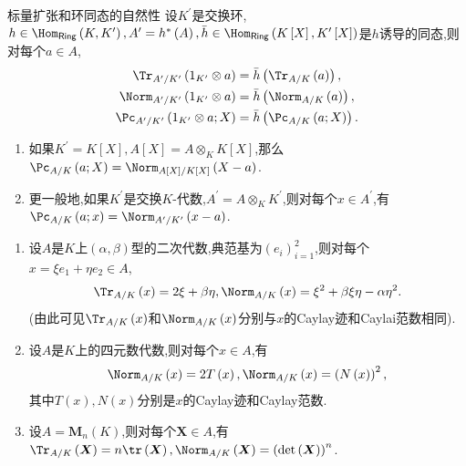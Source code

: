 \begin{proposition}{标量扩张和环同态的自然性}{}
	设$K^{\prime}$是交换环,$h\in\Hom_{\mathsf{Ring}}\left(K,K^{\prime}\right),A^{\prime}=h^{\ast}\left(A\right),\bar{h}\in\Hom_{\mathsf{Ring}}\left(K\left[X\right],K^{\prime}\left[X\right]\right)$是$h$诱导的同态,则对每个$a\in A$,
	\begin{gather*}
		\Tr_{A^{\prime}/K^{\prime}}\left(1_{K^{\prime}}\otimes a\right)=\bar{h}\left(\Tr_{A/K}\left(a\right)\right),\\
		\Norm_{A^{\prime}/K^{\prime}}\left(1_{K^{\prime}}\otimes a\right)=\bar{h}\left(\Norm_{A/K}\left(a\right)\right),\\
		\Pc_{A^{\prime}/K^{\prime}}\left(1_{K^{\prime}}\otimes a;X\right)=\bar{h}\left(\Pc_{A/K}\left(a;X\right)\right).
	\end{gather*}
\end{proposition}

\begin{remark}{}{}
	\begin{enumerate}
		\item 如果$K^{\prime}=K\left[X\right],A\left[X\right]=A\otimes_{K}K\left[X\right]$,那么$\Pc_{A/K}\left(a;X\right)=\Norm_{A\left[X\right]/K\left[X\right]}\left(X-a\right)$.
		\item 更一般地,如果$K^{\prime}$是交换$K$-代数,$A^{\prime}=A\otimes_{K}K^{\prime}$,则对每个$x\in A^{\prime}$,有$\Pc_{A/K}\left(a;x\right)=\Norm_{A^{\prime}/K^{\prime}}\left(x-a\right)$.
	\end{enumerate}
\end{remark}

\begin{example}{}{}
	\begin{enumerate}
		\item 设$A$是$K$上$\left(\alpha,\beta\right)$型的二次代数,典范基为$\left(e_{i}\right)_{i=1}^{2}$,则对每个$x=\xi e_{1}+\eta e_{2}\in A$,
		\begin{align*}
			\Tr_{A/K}\left(x\right)=2\xi+\beta\eta,\Norm_{A/K}\left(x\right)=\xi^{2}+\beta\xi\eta-\alpha\eta^{2}.
		\end{align*}
		(由此可见$\Tr_{A/K}\left(x\right)$和$\Norm_{A/K}\left(x\right)$分别与$x$的Caylay迹和Caylai范数相同).
		\item 设$A$是$K$上的四元数代数,则对每个$x\in A$,有
		\begin{align*}
			\Norm_{A/K}\left(x\right)=2T\left(x\right),\Norm_{A/K}\left(x\right)=\left(N\left(x\right)\right)^{2},
		\end{align*}
		其中$T\left(x\right),N\left(x\right)$分别是$x$的Caylay迹和Caylay范数.
		\item 设$A=\boldsymbol{M}_{n}\left(K\right)$,则对每个$\boldsymbol{X}\in A$,有$\Tr_{A/K}\left(\boldsymbol{X}\right)=n\tr\left(\boldsymbol{X}\right),\Norm_{A/K}\left(\boldsymbol{X}\right)=\left(\det\left(\boldsymbol{X}\right)\right)^{n}$.
	\end{enumerate}
\end{example}














